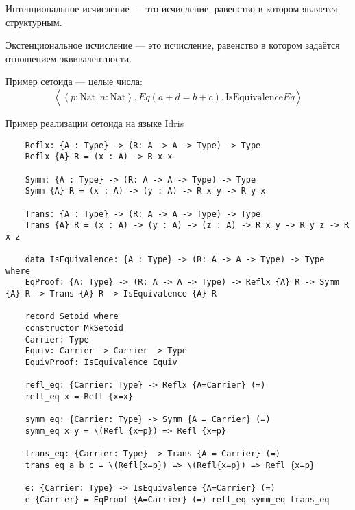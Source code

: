 Интенциональное исчисление --- это исчисление, равенство в котором является структурным.

Экстенциональное исчисление --- это исчисление, равенство в котором задаётся отношением эквивалентности.

Пример сетоида --- целые числа:
\[
    \left< \left<p : \mathrm{Nat}, n : \mathrm{Nat}\right>, \overline{Eq(a+d=b+c)}, \mathrm{IsEquivalence} Eq\right>
\]

Пример реализации сетоида на языке Idris
\begin{verbatim}
    Reflx: {A : Type} -> (R: A -> A -> Type) -> Type
    Reflx {A} R = (x : A) -> R x x

    Symm: {A : Type} -> (R: A -> A -> Type) -> Type
    Symm {A} R = (x : A) -> (y : A) -> R x y -> R y x

    Trans: {A : Type} -> (R: A -> A -> Type) -> Type
    Trans {A} R = (x : A) -> (y : A) -> (z : A) -> R x y -> R y z -> R x z

    data IsEquivalence: {A : Type} -> (R: A -> A -> Type) -> Type where
    EqProof: {A: Type} -> (R: A -> A -> Type) -> Reflx {A} R -> Symm {A} R -> Trans {A} R -> IsEquivalence {A} R

    record Setoid where
    constructor MkSetoid
    Carrier: Type
    Equiv: Carrier -> Carrier -> Type
    EquivProof: IsEquivalence Equiv

    refl_eq: {Carrier: Type} -> Reflx {A=Carrier} (=)
    refl_eq x = Refl {x=x}

    symm_eq: {Carrier: Type} -> Symm {A = Carrier} (=)
    symm_eq x y = \(Refl {x=p}) => Refl {x=p}

    trans_eq: {Carrier: Type} -> Trans {A = Carrier} (=)
    trans_eq a b c = \(Refl{x=p}) => \(Refl{x=p}) => Refl {x=p}

    e: {Carrier: Type} -> IsEquivalence {A=Carrier} (=)
    e {Carrier} = EqProof {A=Carrier} (=) refl_eq symm_eq trans_eq
\end{verbatim}
